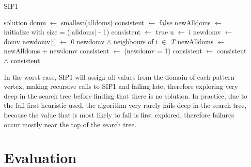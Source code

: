 \documentclass{l4proj}
\begin{document}
\begin{algorithm}
\centering
\caption{SIP1 }
\label{algo:sip1}
\begin{algorithmic}[1]
 \Return solution 
\EndIf
\State domu $\gets$ smallest(alldoms) 
\State consistent $\gets$ false
\State newAlldoms $\gets$ initialize with size = ($|$alldoms$|$ - 1)
 
	\State consistent $\gets$ true
	\State u $\gets$ i 
	 
        \State newdomv $\gets$ domv
        \State newdomv[i] $\gets$ 0 
         
        	\State newdomv $\land$ neighbours of i $\in$ \emph{T} 
        \EndIf
        \State newAlldoms $\gets$ newAlldoms + newdomv 
        \State consistent $\gets$ (newdomv = 1) 
	\EndFor
    \State consistent $\gets$ consistent $\land$  
\EndFor
\State \Return consistent
\EndProcedure
\end{algorithmic}
\end{algorithm}
In the worst case, SIP1 will assign all values from the domain of each pattern vertex, making recursive calls to SIP1 and failing late, therefore exploring very deep in the search tree before finding that there is no solution. In practice, due to the fail first heuristic used, the algorithm very rarely fails deep in the search tree, because the value that is most likely to fail is first explored, therefore failures occur mostly near the top of the search tree. 

\chapter{Evaluation}
\label{ch:evaluation}
\end{document}
